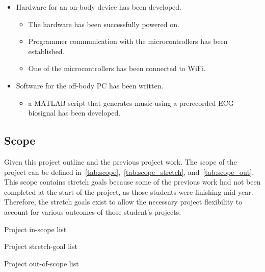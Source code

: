\begin{itemize}
        \item Hardware for an on-body device has been developed.
        \begin{itemize}
                \item The hardware has been successfully powered on.
                \item Programmer communication with the microcontrollers has been established.
                \item One of the microcontrollers has been connected to WiFi.
        \end{itemize}
        \item Software for the off-body PC has been written.
        \begin{itemize}
                \item a MATLAB script that generates music using a prerecorded ECG biosignal has been developed.
        \end{itemize}
\end{itemize}

\subsection{Scope}
Given this project outline and the previous project work.
The scope of the project can be defined in~\autoref{tab:scope},~\autoref{tab:scope_stretch}, and~\autoref{tab:scope_out}.
This scope contains stretch goals because some of the previous work had not been completed at the start of the project,
as those students were finishing mid-year.
Therefore, the stretch goals exist to allow the necessary project flexibility to account for various outcomes of those student's projects.

\begin{table}[!ht]
    \caption{Project in-scope list}\label{tab:scope}
    \centering
    
\end{table}

\begin{table}[!ht]
    \caption{Project stretch-goal list}\label{tab:scope_stretch}
    \centering
    
\end{table}

\begin{table}[!ht]
    \caption{Project out-of-scope list}\label{tab:scope_out}
    \centering
    
\end{table}
